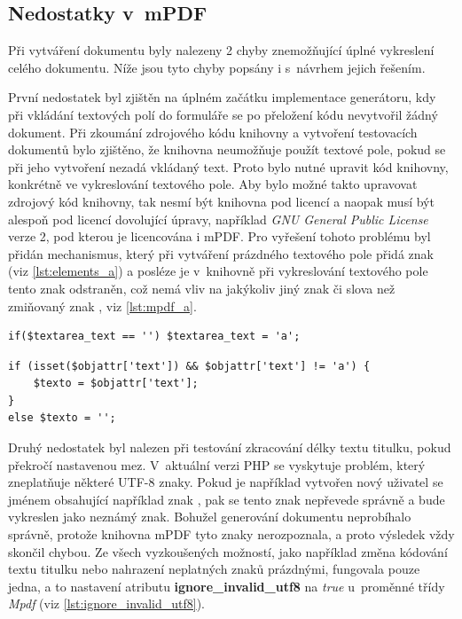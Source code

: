 \subsection{Nedostatky v~mPDF}
Při vytváření dokumentu byly nalezeny 2 chyby znemožňující úplné vykreslení celého dokumentu. Níže jsou tyto chyby popsány i s~návrhem jejich řešením.
\par
První nedostatek byl zjištěn na úplném začátku implementace generátoru, kdy při vkládání textových polí do formuláře se po přeložení kódu nevytvořil žádný dokument. Při zkoumání zdrojového kódu knihovny a vytvoření testovacích dokumentů bylo zjištěno, že knihovna neumožňuje použít textové pole, pokud se při jeho vytvoření nezadá vkládaný text. Proto bylo nutné upravit kód knihovny, konkrétně ve vykreslování textového pole. Aby bylo možné takto upravovat zdrojový kód knihovny, tak nesmí být knihovna pod licencí a naopak musí  být alespoň pod licencí dovolující úpravy, například \textit{GNU General Public License} verze 2, pod kterou je licencována i mPDF. Pro vyřešení tohoto problému byl přidán mechanismus, který při vytváření prázdného textového pole přidá znak  (viz \ref{lst:elements_a}) a posléze je v~knihovně při vykreslování textového pole tento znak odstraněn, což nemá vliv na jakýkoliv jiný znak či slova než zmiňovaný znak , viz \ref{lst:mpdf_a}.
\begin{lstlisting}[caption = {Dočasné přiřazení znaku \uv{\textbf{a}} do textového pole (Elements.php)}, label = {lst:elements_a}, captionpos=b]
if($textarea_text == '') $textarea_text = 'a';
\end{lstlisting}
\begin{lstlisting}[caption = {Odstranění znaku \uv{\textbf{a}} z~textového pole (Mpdf.php)}, label = {lst:mpdf_a}, captionpos=b]
if (isset($objattr['text']) && $objattr['text'] != 'a') {
	$texto = $objattr['text'];
}
else $texto = '';
\end{lstlisting}
\par
Druhý nedostatek byl nalezen při testování zkracování délky textu titulku, pokud překročí nastavenou mez. V~aktuální verzi PHP se vyskytuje problém, který zneplatňuje některé UTF-8 znaky. Pokud je například vytvořen nový uživatel se jménem obsahující například znak , pak se tento znak nepřevede správně a bude vykreslen jako neznámý znak. Bohužel generování dokumentu neprobíhalo správně, protože knihovna mPDF tyto znaky nerozpoznala, a proto výsledek vždy skončil chybou. Ze všech vyzkoušených možností, jako například změna kódování textu titulku nebo nahrazení neplatných znaků prázdnými, fungovala pouze jedna, a to nastavení atributu \textbf{ignore\_invalid\_utf8} na \textit{true} u~proměnné třídy \textit{Mpdf} (viz \ref{lst:ignore_invalid_utf8}).
